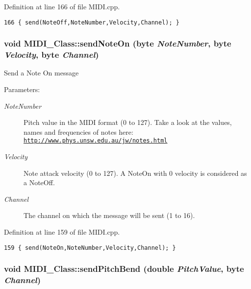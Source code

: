 Definition at line 166 of file MIDI.cpp.

\begin{Code}\begin{verbatim}166 { send(NoteOff,NoteNumber,Velocity,Channel); }
\end{verbatim}
\end{Code}


\hypertarget{class_m_i_d_i___class_9664e523b35d8b42749e7bc3ba888943}{
\subsubsection[{sendNoteOn}]{\setlength{\rightskip}{0pt plus 5cm}void MIDI\_\-Class::sendNoteOn ({\bf byte} {\em NoteNumber}, \/  {\bf byte} {\em Velocity}, \/  {\bf byte} {\em Channel})}}
\label{class_m_i_d_i___class_9664e523b35d8b42749e7bc3ba888943}


Send a Note On message \begin{Desc}
\item[Parameters:]
\begin{description}
\item[{\em NoteNumber}]Pitch value in the MIDI format (0 to 127). Take a look at the values, names and frequencies of notes here: \href{http://www.phys.unsw.edu.au/jw/notes.html}{\tt http://www.phys.unsw.edu.au/jw/notes.html}\par
 \item[{\em Velocity}]Note attack velocity (0 to 127). A NoteOn with 0 velocity is considered as a NoteOff. \item[{\em Channel}]The channel on which the message will be sent (1 to 16). \end{description}
\end{Desc}


Definition at line 159 of file MIDI.cpp.

\begin{Code}\begin{verbatim}159 { send(NoteOn,NoteNumber,Velocity,Channel); }
\end{verbatim}
\end{Code}


\hypertarget{class_m_i_d_i___class_16800e955a1d0d66e6bda6727588b1eb}{
\subsubsection[{sendPitchBend}]{\setlength{\rightskip}{0pt plus 5cm}void MIDI\_\-Class::sendPitchBend (double {\em PitchValue}, \/  {\bf byte} {\em Channel})}}
\label{class_m_i_d_i___class_16800e955a1d0d66e6bda6727588b1eb}


